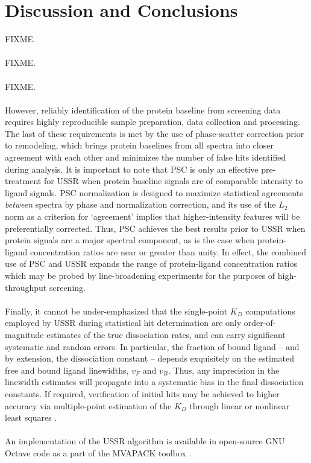 \section{Discussion and Conclusions}

\begin{doublespace}
FIXME.
\\\\
FIXME.
\\\\
FIXME.
\\\\
However, reliably identification of the protein baseline from screening data
requires highly reproducible sample preparation, data collection and
processing. The last of these requirements is met by the use of phase-scatter
correction prior to remodeling, which brings protein baselines from all spectra
into closer agreement with each other and minimizes the number of false hits
identified during analysis. It is important to note that PSC is only an
effective pre-treatment for USSR when protein baseline signals are of
comparable intensity to ligand signals. PSC normalization is designed to
maximize statistical agreements \emph{between} spectra by phase and
normalization correction, and its use of the $L_2$ norm as a criterion for
`agreement' implies that higher-intensity features will be preferentially
corrected. Thus, PSC achieves the best results prior to USSR when protein
signals are a major spectral component, as is the case when protein-ligand
concentration ratios are near or greater than unity. In effect, the combined
use of PSC and USSR expands the range of protein-ligand concentration ratios
which may be probed by \hnmr{} line-broadening experiments for the purposes
of high-throughput screening.
\\\\
Finally, it cannot be under-emphasized that the single-point $K_D$ computations
employed by USSR during statistical hit determination are only
order-of-magnitude estimates of the true dissociation rates, and can carry
significant systematic and random errors. In particular, the fraction of bound
ligand -- and by extension, the dissociation constant -- depends exquisitely
on the estimated free and bound ligand linewidths, $v_F$ and $v_B$. Thus, any
imprecision in the linewidth estimates will propagate into a systematic bias in
the final dissociation constants. If required, verification of initial hits may
be achieved to higher accuracy via multiple-point estimation of the $K_D$
through linear or nonlinear least squares \cite{shortridge:jcomb2008}.
\\\\
An implementation of the USSR algorithm is available in open-source GNU Octave
code as a part of the MVAPACK toolbox \cite{worley:acscb2014}.
\end{doublespace}




